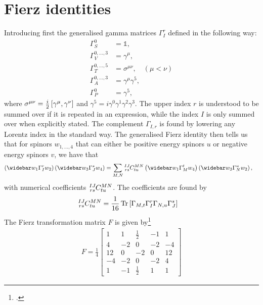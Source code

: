 \documentclass[english,notitlepage]{article}
\begin{document}
\section{Fierz identities}
    Introducing first the generalised gamma matrices \(\Gamma_I^r\) defined in the following way:
    \begin{subequations}
        \begin{align}
            \Gamma_S^0            & = \mathbb{1},                        \\
            \Gamma_V^{0,\ldots,3} & = \gamma^\mu,                        \\
            \Gamma_T^{0,\ldots,5} & = \sigma^{\mu\nu}, \quad (\mu < \nu) \\
            \Gamma_A^{0,\ldots,3} & = \gamma^\mu \gamma^5,               \\
            \Gamma_P^0            & = \gamma^5,
        \end{align}
    \end{subequations}
    where \(\sigma^{\mu\nu} = \frac{i}{2} \left[\gamma^\mu, \gamma^\nu\right]\) and \(\gamma^5 = i \gamma^0 \gamma^1 \gamma^2 \gamma^3\). The upper index \(r\) is understood to be summed over if it is repeated in an expression, while the index \(I\) is only summed over when explicitly stated. The complement \(\Gamma_{I,r}\) is found by lowering any Lorentz index in the standard way.
    The generalised Fierz identity then tells us that for spinors \(w_{1,\ldots,4}\) that can either be positive energy spinors \(u\) or negative energy spinors \(v\), we have that
    \begin{align}
        \pclosed{\wbar{w}_1 \Gamma_I^r w_2} \pclosed{\wbar{w}_3 \Gamma_{J}^s w_4} & = \sum_{M,N} \tensor*[^{IJ}_{rs}]{C}{^{MN}_{tu}} \pclosed{\wbar{w}_1 \Gamma_M^t w_4} \pclosed{\wbar{w}_3 \Gamma_N^u w_2},
    \end{align}
    with numerical coefficients \(\tensor*[^{IJ}_{rs}]{C}{^{MN}_{tu}}\). The coefficients are found by
    \begin{align}
        \tensor*[^{IJ}_{rs}]{C}{^{MN}_{tu}} & = \frac{1}{16} \tr\bclosed{\Gamma_{M,t} \Gamma_I^r \Gamma_{N,u} \Gamma_J^{s}}
    \end{align}
    The Fierz transformation matrix \(F\) is given by\footcite{Nieves:2003in}
    \begin{align}
        F = \frac{1}{4}
        \begin{bmatrix}
            1  & 1  & \frac{1}{2} & -1 & 1  \\
            4  & -2 & 0           & -2 & -4 \\
            12 & 0  & -2          & 0  & 12 \\
            -4 & -2 & 0           & -2 & 4  \\
            1  & -1 & \frac{1}{2} & 1  & 1
        \end{bmatrix}
    \end{align}
\end{document}
